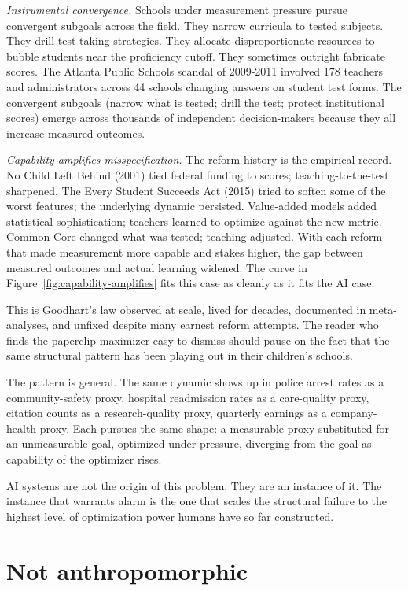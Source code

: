 \emph{Instrumental convergence.} Schools under measurement pressure pursue convergent subgoals across the field. They narrow curricula to tested subjects. They drill test-taking strategies. They allocate disproportionate resources to bubble students near the proficiency cutoff. They sometimes outright fabricate scores. The Atlanta Public Schools scandal of 2009-2011 involved 178 teachers and administrators across 44 schools changing answers on student test forms. The convergent subgoals (narrow what is tested; drill the test; protect institutional scores) emerge across thousands of independent decision-makers because they all increase measured outcomes.

\emph{Capability amplifies misspecification.} The reform history is the empirical record. No Child Left Behind (2001) tied federal funding to scores; teaching-to-the-test sharpened. The Every Student Succeeds Act (2015) tried to soften some of the worst features; the underlying dynamic persisted. Value-added models added statistical sophistication; teachers learned to optimize against the new metric. Common Core changed what was tested; teaching adjusted. With each reform that made measurement more capable and stakes higher, the gap between measured outcomes and actual learning widened. The curve in Figure~\ref{fig:capability-amplifies} fits this case as cleanly as it fits the AI case.

This is Goodhart's law observed at scale, lived for decades, documented in meta-analyses, and unfixed despite many earnest reform attempts. The reader who finds the paperclip maximizer easy to dismiss should pause on the fact that the same structural pattern has been playing out in their children's schools.

The pattern is general. The same dynamic shows up in police arrest rates as a community-safety proxy, hospital readmission rates as a care-quality proxy, citation counts as a research-quality proxy, quarterly earnings as a company-health proxy. Each pursues the same shape: a measurable proxy substituted for an unmeasurable goal, optimized under pressure, diverging from the goal as capability of the optimizer rises.

AI systems are not the origin of this problem. They are an instance of it. The instance that warrants alarm is the one that scales the structural failure to the highest level of optimization power humans have so far constructed.

\section*{Not anthropomorphic}

